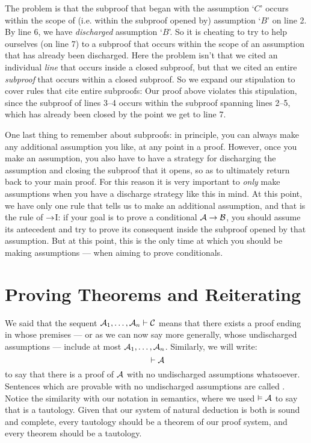 The problem is that the subproof that began with the assumption `$C$' occurs within the scope of (i.e. within the subproof opened by) assumption `$B$' on line 2. By line 6, we have \emph{discharged} assumption `$B$'. So it is cheating to try to help ourselves (on line 7) to a subproof that occurs within the scope of an assumption that has already been discharged.  Here the problem isn't that we cited an individual \emph{line} that occurs inside a closed subproof, but that we cited an entire \emph{subproof} that occurs within a closed subproof.  So we expand our stipulation to cover rules that cite entire subproofs:
Our proof above violates this stipulation, since the subproof of lines 3--4 occurs within the subproof spanning lines 2--5, which has already been closed by the point we get to line 7.

One last thing to remember about subproofs: in principle, you can always make any additional assumption you like, at any point in a proof.  However, once you make an assumption, you also have to have a strategy for discharging the assumption and closing the subproof that it opens, so as to ultimately return back to your main proof.  For this reason it is very important to \emph{only}  make assumptions when you have a discharge strategy like this in mind.  At this point, we have only one rule that tells us to make an additional assumption, and that is the rule of $\rightarrow$I: if your goal is to prove a conditional $\mathcal{A} \rightarrow \mathcal{B}$, you should assume its antecedent  and try to prove its consequent  inside the subproof opened by that assumption.  But at this point, this is the only time at which you should be making assumptions --- when aiming to prove conditionals.





\section{Proving Theorems and Reiterating}\label{s:TheoremsReiterating}

We said that the sequent $\mathcal{A}_1, \ldots, \mathcal{A}_n \vdash \mathcal{C}$ means that there exists a proof ending in  whose premises --- or as we can now say more generally, whose undischarged assumptions --- include at most $\mathcal{A}_1, \ldots, \mathcal{A}_n$.  Similarly, we will write:
$${} \vdash \mathcal{A}$$
to say that there is a proof of $\mathcal{A}$ with no undischarged assumptions whatsoever.  Sentences which are provable with no undischarged assumptions are called .  Notice the similarity with our notation in semantics, where we used $\vDash \mathcal{A}$ to say that  is a tautology.  Given that our system of natural deduction is both is sound and complete, every tautology should be a theorem of our proof system, and every theorem should be a tautology.


